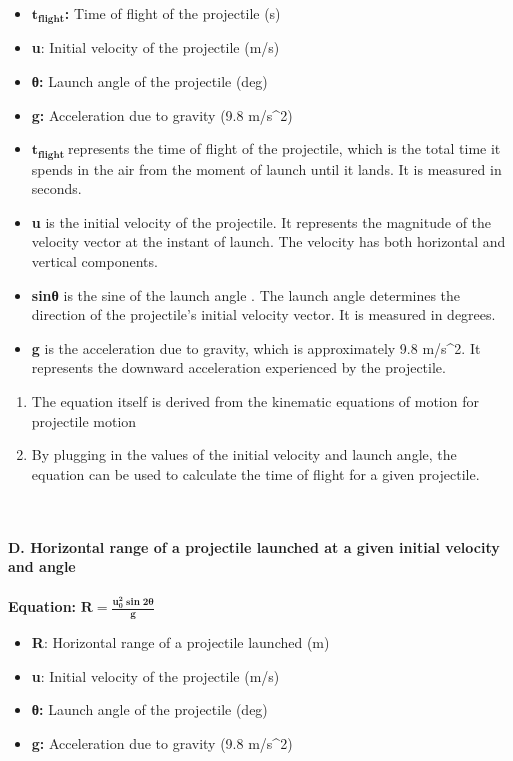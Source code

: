 \documentclass{article}
\begin{document}
\begin{itemize}
\item
  \(\mathbf{t}_{\mathbf{\text{flight}}}\)\textbf{:} Time of flight of
  the projectile (s)
\item
  \textbf{u}: Initial velocity of the projectile (m/s)
\item
  \textbf{θ:} Launch angle of the projectile (deg)
\item
  \textbf{g:} Acceleration due to gravity (9.8 m/s\^{}2)
\item
  \(\mathbf{t}_{\mathbf{\text{flight}}}\mathbf{\ }\)represents the time
  of flight of the projectile, which is the total time it spends in the
  air from the moment of launch until it lands. It is measured in
  seconds.
\item
  \textbf{u} is the initial velocity of the projectile. It represents
  the magnitude of the velocity vector at the instant of launch. The
  velocity has both horizontal and vertical components.
\item
  \textbf{sinθ} is the sine of the launch angle . The launch angle
  determines the direction of the projectile's initial velocity vector.
  It is measured in degrees.
\item
  \textbf{g} is the acceleration due to gravity, which is approximately
  9.8 m/s\^{}2. It represents the downward acceleration experienced by
  the projectile.
\end{itemize}

\begin{enumerate}
\def\labelenumi{\arabic{enumi}.}
\item
  The equation itself is derived from the kinematic equations of motion
  for projectile motion
\item
  By plugging in the values of the initial velocity and launch angle,
  the equation can be used to calculate the time of flight for a given
  projectile.
\end{enumerate}
\\
\\
\textbf{D. Horizontal range of a projectile launched at a given initial
velocity and angle}
\\
\\
\textbf{Equation:}
\(\text{}\mathbf{R =}\frac{\mathbf{u}_{\mathbf{0}}^{\mathbf{2}}\mathbf{\sin}{\mathbf{2}\mathbf{\theta}}}{\mathbf{g}}\)

\begin{itemize}
\item
  \textbf{R}: Horizontal range of a projectile launched (m)
\item
  \textbf{u}: Initial velocity of the projectile (m/s)
\item
  \textbf{θ:} Launch angle of the projectile (deg)
\item
  \textbf{g:} Acceleration due to gravity (9.8 m/s\^{}2)
\end{itemize}
\end{document}
